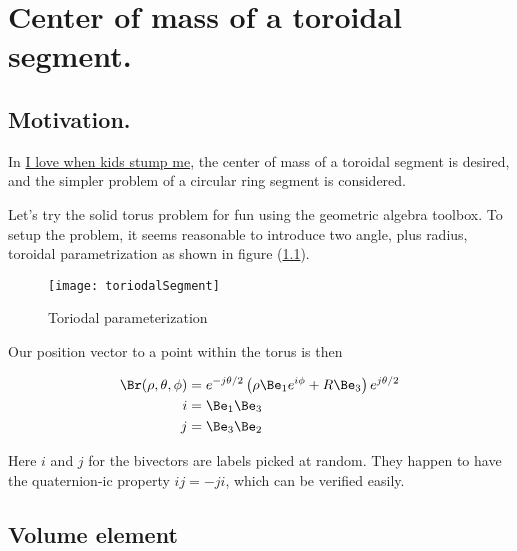 %


\chapter{Center of mass of a toroidal segment.}
\label{chap:torusCenterOfMass}
{}
\date{May 15, 2010}

\beginArtNoToc

\section{Motivation.}

In \href{http://samjshah.com/2010/05/05/i-love-when-kids-stump-me/}{I love when kids stump me}, the center of mass of a toroidal segment is desired, and the simpler problem of a circular ring segment is considered.

Let's try the solid torus problem for fun using the geometric algebra toolbox.  To setup the problem, it seems reasonable to introduce two angle, plus radius, toroidal parametrization as shown in figure (\ref{fig:toriodalSegment}).

\begin{figure}[htp]
\centering
\texttt{[image: toriodalSegment]}
\caption{Toriodal parameterization}\label{fig:toriodalSegment}
\end{figure}

Our position vector to a point within the torus is then

\begin{subequations}
\begin{align}\label{eqn:torusCenterOfMass:1}
\Br(\rho, \theta, \phi) &= e^{-j\theta/2} \left( \rho \Be_1 e^{ i \phi } + R \Be_3 \right) e^{j \theta/2} \\
i &= \Be_1 \Be_3 \\
j &= \Be_3 \Be_2 
\end{align}
\end{subequations}

Here $i$ and $j$ for the bivectors are labels picked at random.  They happen to have the quaternion-ic property $i j = -j i$, which can be verified easily.

\section{Volume element}

